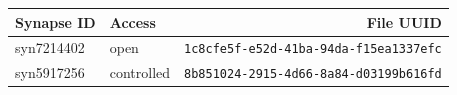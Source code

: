 \begin{table}[tbp]
    \vspace{\baselineskip}

    \begin{subtable}{1\linewidth}
        \centering
        \label{tab:mut-call-qc-data-src-mc3}
        \begin{tabular}{llr}
            \toprule
            Synapse ID & Access & File UUID  \\
            \midrule
            syn7214402 & open & \texttt{1c8cfe5f-e52d-41ba-94da-f15ea1337efc} \\
            syn5917256 & controlled & \texttt{8b851024-2915-4d66-8a84-d03199b616fd} \\
            \bottomrule
        \end{tabular}
    \end{subtable}
\end{table}
